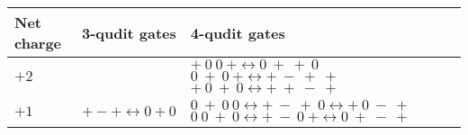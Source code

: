 \begin{table*}[t]
	\centering
	\begin{tabular}{ |P{3cm}||P{4cm}|P{7cm}|  }
		\hline
		Net charge & 3-qudit gates & 4-qudit gates\\
		\hline
		$+2$   &    &  \\
		\hline
		$+1$  & $+ - + \leftrightarrow 0 + 0$ & 
\end{tabular}
\end{table*}

